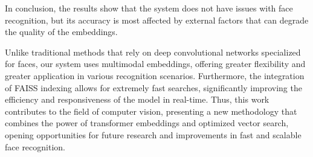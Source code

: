 \documentclass{article}
\begin{document}
\hspace*{1.00cm}In conclusion, the results show that the system does not have issues with face recognition, but its accuracy is most affected by external factors that can degrade the quality of the embeddings.

\hspace*{1.00cm}Unlike traditional methods that rely on deep convolutional networks
 specialized for faces, our system uses multimodal embeddings, offering greater flexibility and greater application in various recognition scenarios. Furthermore, the integration of FAISS indexing allows for extremely fast searches, significantly improving the efficiency and responsiveness of the model in real-time. Thus, this work contributes to the field of computer vision, presenting a new methodology that combines the power of transformer embeddings and optimized vector search, opening opportunities for future research and improvements in fast and scalable face recognition.


\end{document}
